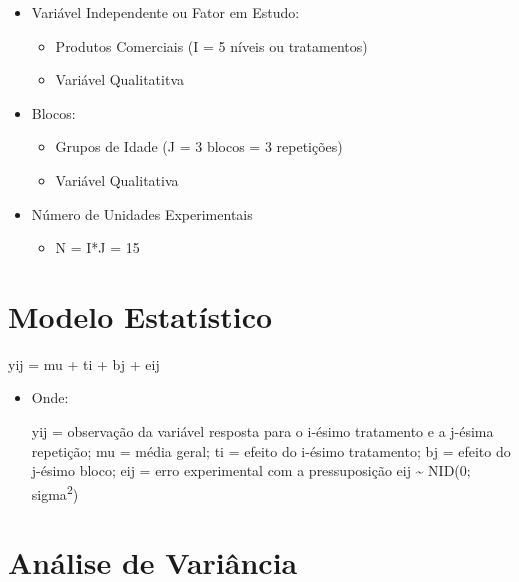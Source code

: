 \documentclass[
]{book}
\providecommand{\tightlist}{%
  \setlength{\itemsep}{0pt}\setlength{\parskip}{0pt}}
\begin{document}
\begin{itemize}
\tightlist
\item
  Variável Independente ou Fator em Estudo:

  \begin{itemize}
  \tightlist
  \item
    Produtos Comerciais (I = 5 níveis ou tratamentos)
  \item
    Variável Qualitatitva
  \end{itemize}
\item
  Blocos:

  \begin{itemize}
  \tightlist
  \item
    Grupos de Idade (J = 3 blocos = 3 repetições)
  \item
    Variável Qualitativa
  \end{itemize}
\item
  Número de Unidades Experimentais

  \begin{itemize}
  \tightlist
  \item
    N = I*J = 15
  \end{itemize}
\end{itemize}

\section{Modelo Estatístico}\label{modelo-estatuxedstico-3}

yij = mu + ti + bj + eij

\begin{itemize}
\item
  Onde:

  yij = observação da variável resposta para o i-ésimo tratamento e a j-ésima repetição;
  mu = média geral;
  ti = efeito do i-ésimo tratamento;
  bj = efeito do j-ésimo bloco;
  eij = erro experimental com a pressuposição eij \textasciitilde{} NID(0; sigma\textsuperscript{2})
\end{itemize}

\section{Análise de Variância}\label{anuxe1lise-de-variuxe2ncia-7}
\end{document}
